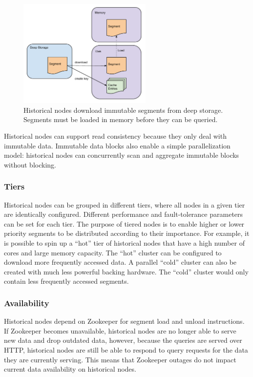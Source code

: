 \documentclass{acm_proc_article-sp}
\begin{document}
\begin{figure}
\centering
\includegraphics[width = 2.6in]{historical_download}
\caption{Historical nodes download immutable segments from deep storage. Segments must be loaded in memory before they can be queried.}
\label{fig:historical_download}
\end{figure}

Historical nodes can support read consistency because they only deal with
immutable data. Immutable data blocks also enable a simple parallelization
model: historical nodes can concurrently scan and aggregate immutable blocks
without blocking.
 
\subsubsection{Tiers}
\label{sec:tiers}
Historical nodes can be grouped in different tiers, where all nodes in a
given tier are identically configured. Different performance and
fault-tolerance parameters can be set for each tier. The purpose of
tiered nodes is to enable higher or lower priority segments to be
distributed according to their importance. For example, it is possible
to spin up a “hot” tier of historical nodes that have a high number of
cores and large memory capacity. The “hot” cluster can be configured to
download more frequently accessed data. A parallel “cold” cluster
can also be created with much less powerful backing hardware. The
“cold” cluster would only contain less frequently accessed segments.

\subsubsection{Availability}
Historical nodes depend on Zookeeper for segment load and unload instructions.
If Zookeeper becomes unavailable, historical nodes are no longer able to serve
new data and drop outdated data, however, because the queries are served over
HTTP, historical nodes are still be able to respond to query requests for
the data they are currently serving. This means that Zookeeper outages do not
impact current data availability on historical nodes. 
\end{document}
